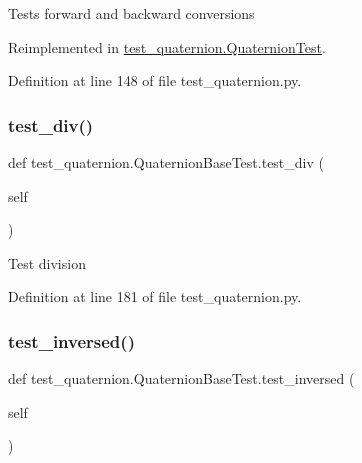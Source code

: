 \begin{DoxyVerb}Tests forward and backward conversions
\end{DoxyVerb}
 

Reimplemented in \mbox{\hyperlink{classtest__quaternion_1_1QuaternionTest_ae80f7e08845739c1d36595842c0f1424}{test\+\_\+quaternion.\+Quaternion\+Test}}.



Definition at line 148 of file test\+\_\+quaternion.\+py.

\mbox{\label{classtest__quaternion_1_1QuaternionBaseTest_a0e9ec1c10202bc5b4aadeff6bd47061c}} 
\subsubsection{\texorpdfstring{test\_div()}{test\_div()}}
{\footnotesize\ttfamily def test\+\_\+quaternion.\+Quaternion\+Base\+Test.\+test\+\_\+div (\begin{DoxyParamCaption}\item[{}]{self }\end{DoxyParamCaption})}

\begin{DoxyVerb}Test division\end{DoxyVerb}
 

Definition at line 181 of file test\+\_\+quaternion.\+py.

\mbox{\label{classtest__quaternion_1_1QuaternionBaseTest_a893391ea74a2bad8b400368c19e33ad0}} 
\subsubsection{\texorpdfstring{test\_inversed()}{test\_inversed()}}
{\footnotesize\ttfamily def test\+\_\+quaternion.\+Quaternion\+Base\+Test.\+test\+\_\+inversed (\begin{DoxyParamCaption}\item[{}]{self }\end{DoxyParamCaption})}

